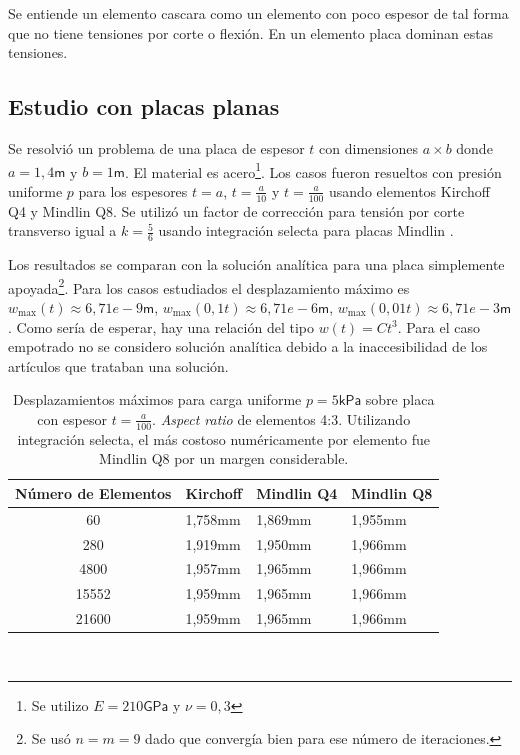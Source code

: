 \documentclass[onecolumn,10pt,titlepage]{article}
\newcommand{\unit}[1]{\textsf{#1}}
\newcommand{\milli}{\unit{m}}
\newcommand{\giga}{\unit{G}}
\newcommand{\meter}{\unit{m}}
\newcommand{\pascal}{\unit{Pa}}
\newcommand{\kilo}{\unit{k}}
\newcommand{\si}[1]{#1}
\newcommand{\SI}[2]{#1\si{#2}}
\begin{document}
Se entiende un elemento cascara como un elemento con poco espesor de tal forma que no tiene tensiones por corte o flexión. En un elemento placa dominan estas tensiones. 


\subsection{Estudio con placas planas}
Se resolvió un problema de una placa de espesor $t$ con dimensiones $a\times b$ donde $a=1,4\si{\meter}$ y $b=1\si{\meter}$. El material es acero\footnote{Se utilizo $E=\SI{210}{\giga \pascal}$ y $\nu=0,3$}. Los casos fueron resueltos con presión uniforme $p$ para los espesores $t=a$, $t=\frac{a}{10}$ y $t=\frac{a}{100}$ usando elementos Kirchoff Q4 y Mindlin Q8. Se utilizó un factor de corrección para tensión por corte transverso igual a $k=\frac{5}{6}$ usando integración selecta\citep{cook2007concepts} para placas Mindlin . 

Los resultados se comparan con la solución analítica para una placa simplemente apoyada\citep{ugural2003advanced}\footnote{Se usó $n=m=9$ dado que convergía bien para ese número de iteraciones.}. Para los casos estudiados el desplazamiento máximo es $w_{\max}(t)\approx \SI{6,71e-9}{\meter}$, $w_{\max}(0,1t)\approx \SI{6,71e-6}{\meter}$, $w_{\max}(0,01t)\approx \SI{6,71e-3}{\meter}$. Como sería de esperar, hay una relación del tipo $w(t)=Ct^3$. Para el caso empotrado no se considero solución analítica debido a la inaccesibilidad de los artículos que trataban una solución. 
\begin{table}[htb!] 
	\centering
	\begin{tabular}{clll}
		Número de Elementos& Kirchoff & Mindlin Q4 & Mindlin Q8  \\ \hline
		60  & \SI{1,758}{\milli \meter}  &  \SI{1,869}{\milli \meter}  & \SI{1,955}{\milli \meter} \\
		280  & \SI{1,919}{\milli \meter}  &  \SI{1,950}{\milli \meter}  & \SI{1,966}{\milli \meter} \\
		4800 &\SI{1,957}{\milli \meter}  &   \SI{1,965}{\milli \meter} &\SI{1,966}{\milli \meter} \\
		15552 &  \SI{1,959}{\milli \meter}   &  \SI{1,965}{\milli \meter}  & \SI{1,966}{\milli \meter}\\
		21600&  \SI{1,959}{\milli \meter}& \SI{1,965}{\milli \meter}  & \SI{1,966}{\milli \meter}
	\end{tabular}\
	\caption{Desplazamientos máximos para carga uniforme $p=\SI{5}{\kilo \pascal}$ sobre placa con espesor $t=\frac{a}{100}$. \emph{Aspect ratio} de elementos 4:3. Utilizando integración selecta\citep{cook2007concepts}, el más costoso numéricamente por elemento fue Mindlin Q8 por un margen considerable.}
	\label{tab:Convergencia}
\end{table}
\end{document}
